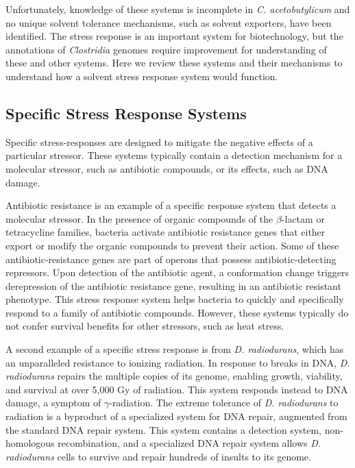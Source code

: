 Unfortunately, knowledge of these systems is incomplete in \textit{C. acetobutylicum} and no unique solvent tolerance mechanisms, such as solvent exporters, have been identified. The stress response is an important system for biotechnology, but the annotations of \textit{Clostridia} genomes require improvement for understanding of these and other systems. Here we review these systems and their mechanisms to understand how a solvent stress response system would function.


\subsection{Specific Stress Response Systems}
Specific stress-responses are designed to mitigate the negative effects of a particular stressor. These systems typically contain a detection mechanism for a molecular stressor, such as antibiotic compounds,\cite{127} or its effects, such as DNA damage.\cite{128}

Antibiotic resistance is an example of a specific response system that detects a molecular stressor. In the presence of organic compounds of the $\beta$-lactam\cite{127} or tetracycline families,\cite{130} bacteria activate antibiotic resistance genes that either export or modify the organic compounds to prevent their action. Some of these antibiotic-resistance genes are part of operons that possess antibiotic-detecting repressors.\cite{127} Upon detection of the antibiotic agent, a conformation change triggers derepression of the antibiotic resistance gene, resulting in an antibiotic resistant phenotype. This stress response system helps bacteria to quickly and specifically respond to a family of antibiotic compounds. However, these systems typically do not confer survival benefits for other stressors, such as heat stress.

A second example of a specific stress response is from \textit{D. radiodurans}, which has an unparalleled resistance to ionizing radiation.\cite{129} In response to breaks in DNA, \textit{D. radiodurans} repairs the multiple copies of its genome, enabling growth, viability, and survival at over 5,000 Gy of radiation.\cite{129} This system responds instead to DNA damage, a symptom of $\gamma$-radiation. The extreme tolerance of \textit{D. radiodurans} to radiation is a byproduct of a specialized system for DNA repair,\cite{129} augmented from the standard DNA repair system.\cite{128} This system contains a detection system, non-homologous recombination, and a specialized DNA repair system allows \textit{D. radiodurans} cells to survive and repair hundreds of insults to its genome. 

